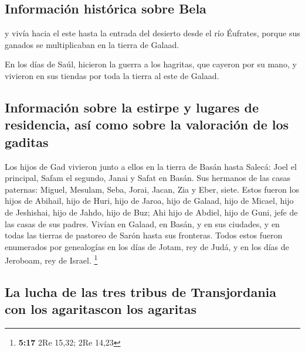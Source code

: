 \begin{paracol}{2}
\hypertarget{informaciuxf3n-histuxf3rica-sobre-bela}{%
\subsection{Información histórica sobre
Bela}\label{informaciuxf3n-histuxf3rica-sobre-bela}}

 y vivía hacia el este hasta la entrada del desierto desde
el río Éufrates, porque sus ganados se multiplicaban en la tierra de
Galaad.

 En los días de Saúl, hicieron la guerra a los hagritas,
que cayeron por su mano, y vivieron en sus tiendas por toda la tierra al
este de Galaad.

\hypertarget{informaciuxf3n-sobre-la-estirpe-y-lugares-de-residencia-asuxed-como-sobre-la-valoraciuxf3n-de-los-gaditas}{%
\subsection{Información sobre la estirpe y lugares de residencia, así
como sobre la valoración de los
gaditas}\label{informaciuxf3n-sobre-la-estirpe-y-lugares-de-residencia-asuxed-como-sobre-la-valoraciuxf3n-de-los-gaditas}}

 Los hijos de Gad vivieron junto a ellos en la tierra de
Basán hasta Salecá:  Joel el principal, Safam el segundo,
Janai y Safat en Basán.  Sus hermanos de las casas
paternas: Miguel, Mesulam, Seba, Jorai, Jacan, Zia y Eber, siete.
 Estos fueron los hijos de Abihail, hijo de Huri, hijo de
Jaroa, hijo de Galaad, hijo de Micael, hijo de Jeshishai, hijo de Jahdo,
hijo de Buz;  Ahi hijo de Abdiel, hijo de Guni, jefe de
las casas de sus padres.  Vivían en Galaad, en Basán, y
en sus ciudades, y en todas las tierras de pastoreo de Sarón hasta sus
fronteras.  Todos estos fueron enumerados por genealogías
en los días de Jotam, rey de Judá, y en los días de Jeroboam, rey de
Israel. \footnote{\textbf{5:17} 2Re 15,32; 2Re 14,23}

\hypertarget{la-lucha-de-las-tres-tribus-de-transjordania-con-los-agaritascon-los-agaritas}{%
\subsection{La lucha de las tres tribus de Transjordania con los
agaritascon los
agaritas}\label{la-lucha-de-las-tres-tribus-de-transjordania-con-los-agaritascon-los-agaritas}}


\end{paracol}
